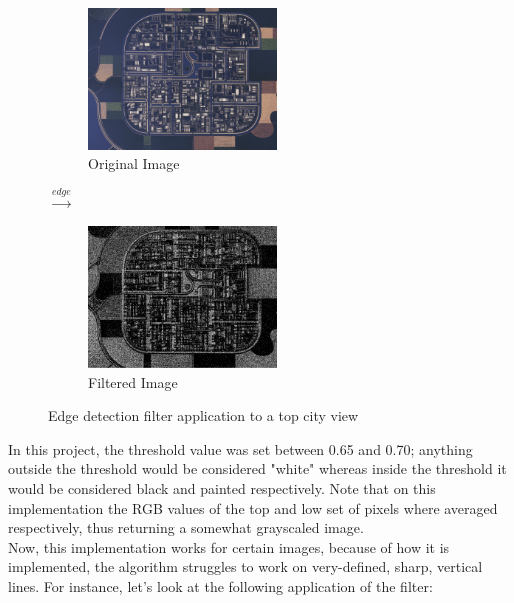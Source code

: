 \documentclass[a4paper,12pt]{article}
\begin{document}
	\begin{figure}[h]
		\centering
		\begin{subfigure}{.47\textwidth}
			\centering
			\includegraphics[width=5cm]{city2.png}
			\caption{Original Image}
		\end{subfigure}%
		{\LARGE$\xrightarrow{edge}$}%
		\begin{subfigure}{.47\textwidth}
			\centering
			\includegraphics[width=5cm]{jv_edge_city2.png}
			\caption{Filtered Image}
		\end{subfigure}

		\caption{Edge detection filter application to a top city view}
	\end{figure}	

	In this project, the threshold value was set between 0.65 and 0.70; anything outside the threshold would be considered "white" whereas inside the threshold it would be considered black and painted respectively. Note that on this implementation the RGB values of the top and low set of pixels where averaged respectively, thus returning a somewhat grayscaled image.\\
	
	Now, this implementation works for certain images, because of how it is implemented, the algorithm struggles to work on very-defined, sharp, vertical lines. For instance, let's look at the following application of the filter:\\
	
\end{document}
